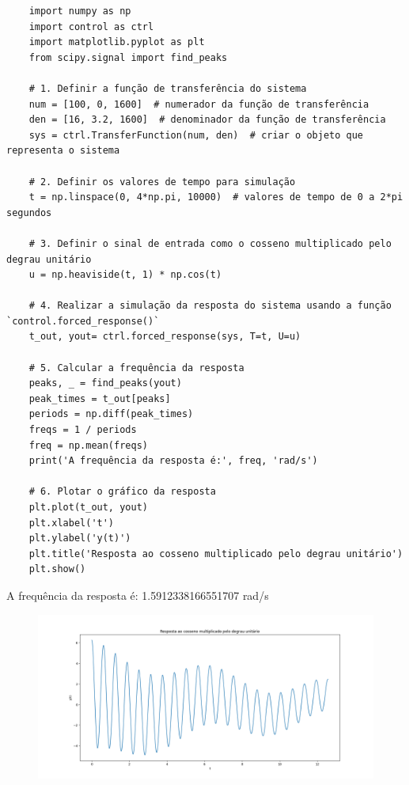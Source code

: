 \documentclass[10pt]{article}
\begin{document}
\begin{verbatim}
    import numpy as np
    import control as ctrl
    import matplotlib.pyplot as plt
    from scipy.signal import find_peaks

    # 1. Definir a função de transferência do sistema
    num = [100, 0, 1600]  # numerador da função de transferência
    den = [16, 3.2, 1600]  # denominador da função de transferência
    sys = ctrl.TransferFunction(num, den)  # criar o objeto que representa o sistema

    # 2. Definir os valores de tempo para simulação
    t = np.linspace(0, 4*np.pi, 10000)  # valores de tempo de 0 a 2*pi segundos

    # 3. Definir o sinal de entrada como o cosseno multiplicado pelo degrau unitário
    u = np.heaviside(t, 1) * np.cos(t)

    # 4. Realizar a simulação da resposta do sistema usando a função `control.forced_response()`
    t_out, yout= ctrl.forced_response(sys, T=t, U=u)

    # 5. Calcular a frequência da resposta
    peaks, _ = find_peaks(yout)
    peak_times = t_out[peaks]
    periods = np.diff(peak_times)
    freqs = 1 / periods
    freq = np.mean(freqs)
    print('A frequência da resposta é:', freq, 'rad/s')

    # 6. Plotar o gráfico da resposta
    plt.plot(t_out, yout)
    plt.xlabel('t')
    plt.ylabel('y(t)')
    plt.title('Resposta ao cosseno multiplicado pelo degrau unitário')
    plt.show()
\end{verbatim}

A frequência da resposta é: 1.5912338166551707 rad/s

\newpage

\begin{figure}[h]
    \includegraphics[scale=0.45]{Figure_1.png}
    \centering
\end{figure}
\end{document}
